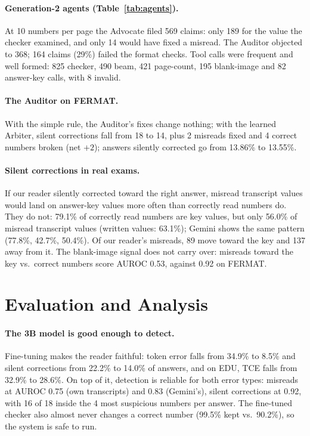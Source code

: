 \documentclass[11pt]{article}
\begin{document}
\paragraph{Generation-2 agents (Table~\ref{tab:agents}).} At 10 numbers per page the Advocate filed 569 claims: only 189 for the value the checker examined, and only 14 would have fixed a misread. The Auditor objected to 368; 164 claims (29\%) failed the format checks. Tool calls were frequent and well formed: 825 checker, 490 beam, 421 page-count, 195 blank-image and 82 answer-key calls, with 8 invalid.

\paragraph{The Auditor on FERMAT.} With the simple rule, the Auditor's fixes change nothing; with the learned Arbiter, silent corrections fall from 18 to 14, plus 2 misreads fixed and 4 correct numbers broken (net $+2$); answers silently corrected go from 13.86\% to 13.55\%.

\paragraph{Silent corrections in real exams.} If our reader silently corrected toward the right answer, misread transcript values would land on answer-key values more often than correctly read numbers do. They do not: 79.1\% of correctly read numbers are key values, but only 56.0\% of misread transcript values (written values: 63.1\%); Gemini shows the same pattern (77.8\%, 42.7\%, 50.4\%). Of our reader's misreads, 89 move toward the key and 137 away from it. The blank-image signal does not carry over: misreads toward the key vs.\ correct numbers score AUROC 0.53, against 0.92 on FERMAT.


\section{Evaluation and Analysis}
\label{sec:eval}

\paragraph{The 3B model is good enough to detect.} Fine-tuning makes the reader faithful: token error falls from 34.9\% to 8.5\% and silent corrections from 22.2\% to 14.0\% of answers, and on EDU, TCE falls from 32.9\% to 28.6\%. On top of it, detection is reliable for both error types: misreads at AUROC 0.75 (own transcripts) and 0.83 (Gemini's), silent corrections at 0.92, with 16 of 18 inside the 4 most suspicious numbers per answer. The fine-tuned checker also almost never changes a correct number (99.5\% kept vs.\ 90.2\%), so the system is safe to run.
\end{document}
